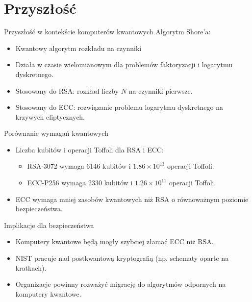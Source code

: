 \section{Przyszłość}
\begin{frame}{Przyszłość w kontekście komputerów kwantowych}
       Algorytm Shore'a:
        \begin{itemize}
            \item Kwantowy algorytm rozkładu na czynniki
            \item Działa w czasie wielomianowym dla problemów faktoryzacji i logarytmu dyskretnego.
            \item Stosowany do RSA: rozkład liczby $N$ na czynniki pierwsze.
            \item Stosowany do ECC: rozwiązanie problemu logarytmu dyskretnego na krzywych eliptycznych.
        \end{itemize}
\end{frame}
\begin{frame}{Porównanie wymagań kwantowych}
    \begin{itemize}
        \item Liczba kubitów i operacji Toffoli dla RSA i ECC:
        \begin{itemize}
            \item RSA-3072 wymaga 6146 kubitów i $1.86 \times 10^{13}$ operacji Toffoli.
            \item ECC-P256 wymaga 2330 kubitów i $1.26 \times 10^{11}$ operacji Toffoli.
        \end{itemize}
        \item ECC wymaga mniej zasobów kwantowych niż RSA o równoważnym poziomie bezpieczeństwa.
    \end{itemize}
\end{frame}
\begin{frame}{Implikacje dla bezpieczeństwa}
    \begin{itemize}
        \item Komputery kwantowe będą mogły szybciej złamać ECC niż RSA.
        \item NIST pracuje nad postkwantową kryptografią (np. schematy oparte na kratkach).
        \item Organizacje powinny rozważyć migrację do algorytmów odpornych na komputery kwantowe.
    \end{itemize}
\end{frame}
